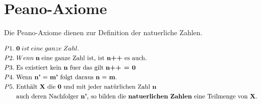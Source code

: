 \documentclass[../AbiMappe_Mathe.tex]{subfiles}
\begin{document}
\theoremstyle{nonumberplain}


\section{Peano-Axiome}
Die Peano-Axiome dienen zur Definition der natuerliche Zahlen.

\begin{fmytheo1}
\vspace{-0.5 cm}
\begin{align*}
P1.\hspace{0.3 em} &\textbf{0}\;ist\; eine\; ganze\; Zahl.\\
P2.\hspace{0.3 em} &Wenn \; \textbf{n}\;\text{eine ganze Zahl ist, ist \textbf{n++} es auch.}\\
P3. \hspace{0.3 em} &\text{Es existiert kein \textbf{n} fuer das gilt \textbf{n++ = 0}} \\
P4.  \hspace{0.3 em} &\text{Wenn \textbf{n'} = \textbf{m'} folgt daraus  \textbf{n} = \textbf{m}.} \\
P5.  \hspace{0.3 em} &\text{Enthält \textbf{X} die \textbf{0} und mit jeder natürlichen Zahl \textbf{n}}\\
&\text{auch deren Nachfolger \textbf{n'}, so bilden die \textbf{natuerlichen} \textbf{Zahlen} eine Teilmenge von \textbf{X}.}
\end{align*}
\end{fmytheo1}
\end{document}
